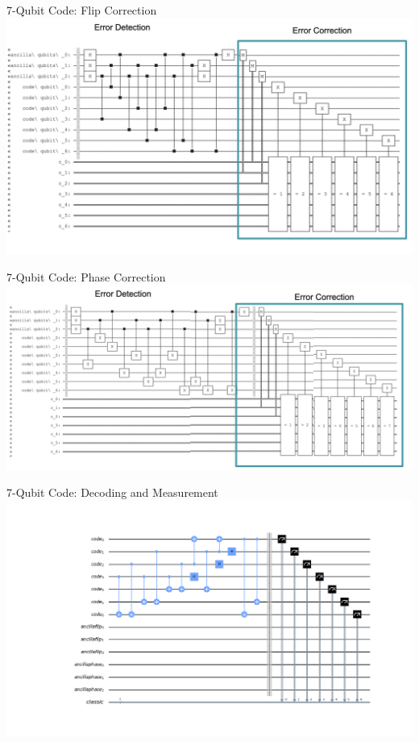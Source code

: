 \documentclass{beamer}
\begin{document}
\begin{frame}{7-Qubit Code: Flip Correction}
  \includegraphics[width=\textwidth]{7qb_correction_diagram}
\end{frame}

\begin{frame}{7-Qubit Code: Phase Correction}
  \includegraphics[width=\textwidth]{7qb_phase_correction}
\end{frame}

\begin{frame}{7-Qubit Code: Decoding and Measurement}
  \includegraphics[width=\textwidth]{7qb_end}
\end{frame}
\end{document}

